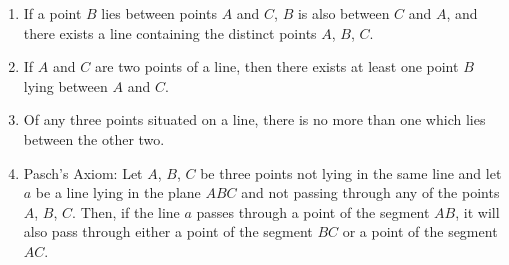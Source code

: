 \documentclass{ximera}
\begin{document}
\begin{enumerate}

\item If a point $B$ lies between points $A$ and $C$, $B$ is also
  between $C$ and $A$, and there exists a line containing the distinct
  points $A$, $B$, $C$.

\item If $A$ and $C$ are two points of a line, then there exists at
  least one point $B$ lying between $A$ and $C$.

\item Of any three points situated on a line, there is no more than
  one which lies between the other two.

\item Pasch's Axiom: Let $A$, $B$, $C$ be three points not lying in the same
  line and let $a$ be a line lying in the plane $ABC$ and not passing
  through any of the points $A$, $B$, $C$. Then, if the line $a$ passes
  through a point of the segment $AB$, it will also pass through either
  a point of the segment $BC$ or a point of the segment $AC$.
\end{enumerate}
\end{document}
